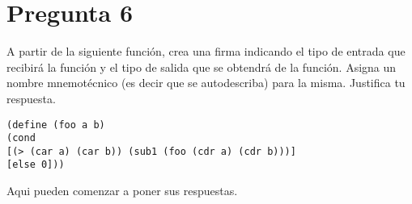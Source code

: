 \newpage
\section*{Pregunta 6}
\Large 
A partir de la siguiente función, crea una firma indicando el tipo de entrada que recibirá la función y el tipo de salida que se obtendrá de la función. Asigna un nombre mnemotécnico (es decir que se autodescriba) para la misma. Justifica tu respuesta.

\large
\begin{verbatim}
(define (foo a b)
(cond
[(> (car a) (car b)) (sub1 (foo (cdr a) (cdr b)))]
[else 0]))
\end{verbatim}
\large
Aqui pueden comenzar a poner sus respuestas.